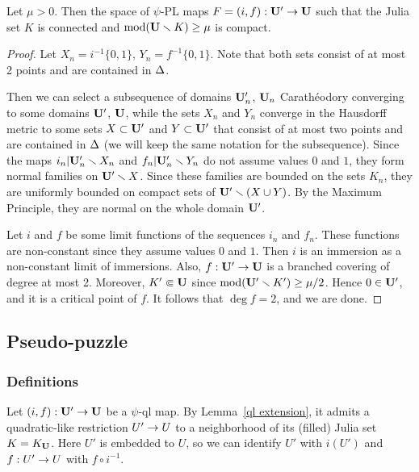 \begin{lem}\label{compactness}
  Let $\mu>0$. Then the space of $\psi$-PL maps $F=(i,f): {\mathbf{U}}'\rightarrow {\mathbf{U}}$ such that the  Julia set $K$
is connected and  $\operatorname{mod}({\mathbf{U}} \smallsetminus K)\geq \mu$ is compact.
\end{lem}

\begin{proof}
 Let  $X_n= i^{-1}\{0,1\}$,  $Y_n= f^{-1}\{0,1\}$.
Note that both sets consist of at most 2 points and are contained in $\Delta$.

Then we can select a subsequence of domains ${\mathbf{U}}_n'$, ${\mathbf{U}}_n$ Carath\'eodory converging to some
domains ${\mathbf{U}}'$, ${\mathbf{U}}$, while the sets $X_n$ and $Y_n$ converge in the Hausdorff metric to some sets
$X\subset {\mathbf{U}}'$  and $Y\subset {\mathbf{U}}'$ that consist of at most two points and are contained in $\Delta$
 (we will keep the same notation for the subsequence).
Since  the maps $i_n| {\mathbf{U}}_n'\smallsetminus X_n$ and $f_n| {\mathbf{U}}_n'\smallsetminus Y_n$ do not assume values $0$ and $1$,
they form normal families on ${\mathbf{U}}'\smallsetminus X $. Since these families are bounded on the sets $K_n$,
they are uniformly bounded on compact sets of ${\mathbf{U}}'\smallsetminus (X\cup Y)$.
By the Maximum Principle, they are normal on the whole domain ${\mathbf{U}}'$.


Let $i$ and $f$ be some limit functions of the sequences $i_n$ and $f_n$.
These functions are non-constant since they assume values $0$ and $1$.
Then $i$ is an immersion as a non-constant limit of immersions.
Also, $f: {\mathbf{U}}'\rightarrow {\mathbf{U}}$ is a branched covering of degree at most 2.
Moreover,  $K'\Subset {\mathbf{U}}$ since $\operatorname{mod}({\mathbf{U}}'\smallsetminus K')\geq \mu/2$. Hence $0\in {\mathbf{U}}'$, and it is a critical point of $f$.
It follows that $\deg f=2$, and we are done.
\end{proof}


\subsection{Pseudo-puzzle}\label{psi-puzzle}

\subsubsection{Definitions}
   Let $(i,f) : {\mathbf{U}}'\rightarrow {\mathbf{U}}$ be a $\psi$-ql map.
By Lemma~\ref{ql extension}, it admits a quadratic-like restriction $U'\rightarrow U$ to a neighborhood of
its (filled) Julia set  $K=K_{\mathbf{U}}$.
Here $U'$ is embedded to $U$, so we can identify $U'$ with $i(U')$
and $ f: U'\rightarrow U $ with  $f \circ i^{-1} $.

